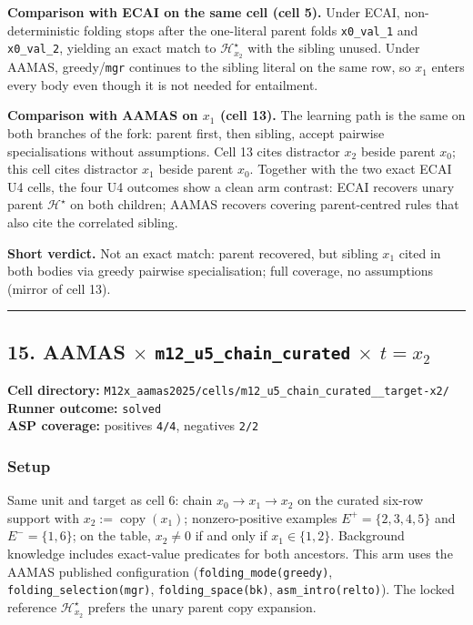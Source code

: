 \documentclass[11pt]{article}
\begin{document}
\textbf{Comparison with ECAI on the same cell (cell 5).} Under ECAI, non-deterministic folding stops after the one-literal parent folds \texttt{x0\_val\_1} and \texttt{x0\_val\_2}, yielding an exact match to \(\mathcal{H}_{x_2}^\star\) with the sibling unused. Under AAMAS, greedy/\texttt{mgr} continues to the sibling literal on the same row, so \(x_1\) enters every body even though it is not needed for entailment.

\textbf{Comparison with AAMAS on \(x_1\) (cell 13).} The learning path is the same on both branches of the fork: parent first, then sibling, accept pairwise specialisations without assumptions. Cell 13 cites distractor \(x_2\) beside parent \(x_0\); this cell cites distractor \(x_1\) beside parent \(x_0\). Together with the two exact ECAI U4 cells, the four U4 outcomes show a clean arm contrast: ECAI recovers unary parent \(\mathcal{H}^\star\) on both children; AAMAS recovers covering parent-centred rules that also cite the correlated sibling.

\textbf{Short verdict.} Not an exact match: parent recovered, but sibling \(x_1\) cited in both bodies via greedy pairwise specialisation; full coverage, no assumptions (mirror of cell 13).

\medskip\hrule\medskip

\subsection{\texorpdfstring{15. AAMAS \(\times\) \texttt{m12\_u5\_chain\_curated} \(\times\) \(t=x_2\)}{15. AAMAS - m12-u5-chain-curated - target x2}}

\textbf{Cell directory:} \texttt{M12x\_aamas2025/cells/m12\_u5\_chain\_curated\_\_target-x2/}\\
\textbf{Runner outcome:} \texttt{solved}\\
\textbf{ASP coverage:} positives \texttt{4/4}, negatives \texttt{2/2}

\subsubsection{Setup}

Same unit and target as cell 6: chain \(x_0\to x_1\to x_2\) on the curated six-row support with \(x_2:=\operatorname{copy}(x_1)\); nonzero-positive examples \(E^+=\{2,3,4,5\}\) and \(E^-=\{1,6\}\); on the table, \(x_2\neq 0\) if and only if \(x_1\in\{1,2\}\). Background knowledge includes exact-value predicates for both ancestors. This arm uses the AAMAS published configuration (\texttt{folding\_mode(greedy)}, \texttt{folding\_selection(mgr)}, \texttt{folding\_space(bk)}, \texttt{asm\_intro(relto)}). The locked reference \(\mathcal{H}_{x_2}^\star\) prefers the unary parent copy expansion.
\end{document}
